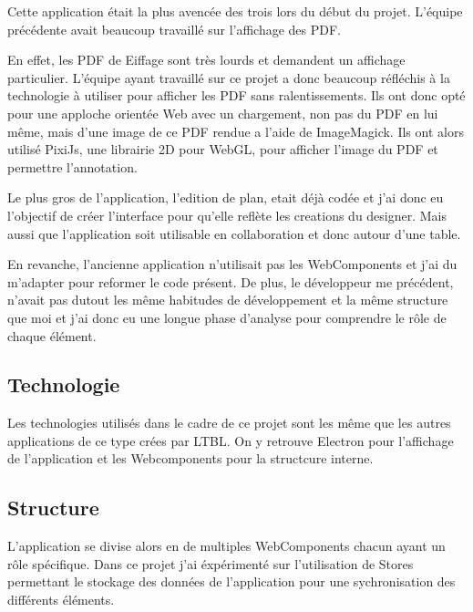 Cette application était la plus avencée des trois lors du début du projet.
L'équipe précédente avait beaucoup travaillé sur l'affichage des PDF.

En effet, les PDF de Eiffage sont très lourds et demandent un affichage particulier.
L'équipe ayant travaillé sur ce projet a donc beaucoup réfléchis à la technologie à utiliser pour afficher les PDF sans ralentissements.
Ils ont donc opté pour une apploche orientée Web avec un chargement, non pas du PDF en lui même, mais d'une image de ce PDF rendue a l'aide de ImageMagick.
Ils ont alors utilisé PixiJs, une librairie 2D pour WebGL, pour afficher l'image du PDF et permettre l'annotation.

Le plus gros de l'application, l'edition de plan, etait déjà codée et j'ai donc eu l'objectif de créer l'interface pour qu'elle reflète les creations du designer.
Mais aussi que l'application soit utilisable en collaboration et donc autour d'une table.

En revanche, l'ancienne application n'utilisait pas les WebComponents et j'ai du m'adapter pour reformer le code présent.
De plus, le développeur me précédent, n'avait pas dutout les même habitudes de développement et la même structure que moi et j'ai donc eu une longue phase d'analyse pour comprendre le rôle de chaque élément.

\subsection{Technologie}
\label{eiffageTablePlanTechnologie}

Les technologies utilisés dans le cadre de ce projet sont les même que les autres applications de ce type crées par LTBL.
On y retrouve Electron pour l'affichage de l'application et les Webcomponents pour la structcure interne.

\subsection{Structure}
\label{eiffageTablePlanStructure}

L'application se divise alors en de multiples WebComponents chacun ayant un rôle spécifique.
Dans ce projet j'ai éxpérimenté sur l'utilisation de Stores permettant le stockage des données de l'application pour une sychronisation des différents éléments.


